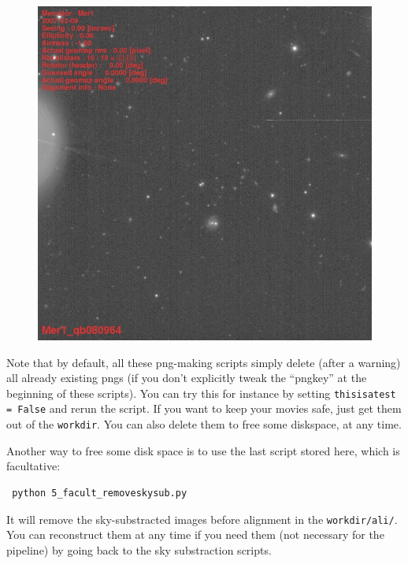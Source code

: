 \begin{figure}[htbp]
\begin{minipage}[c]{0.5\textwidth}
\includegraphics[width=1.0\textwidth]{images/alipng.jpg}
\end{minipage} \hfill
\begin{minipage}[c]{.48\textwidth}
\caption{ \label{alipng}}
\end{minipage}
\end{figure}


Note that by default, all these png-making scripts simply delete (after a warning) all already existing pngs (if you don't explicitly tweak the ``pngkey'' at the beginning of these scripts). You can try this for instance by setting \verb+thisisatest = False+ and rerun the script. If you want to keep your movies safe, just get them out of the \verb+workdir+. You can also delete them to free some diskspace, at any time.

Another way to free some disk space is to use the last script stored here, which is facultative:

\begin{verbatim}
 python 5_facult_removeskysub.py
\end{verbatim}
It will remove the sky-substracted images before alignment in the \verb+workdir/ali/+. You can reconstruct them at any time if you need them (not necessary for the pipeline) by going back to the sky substraction scripts.

